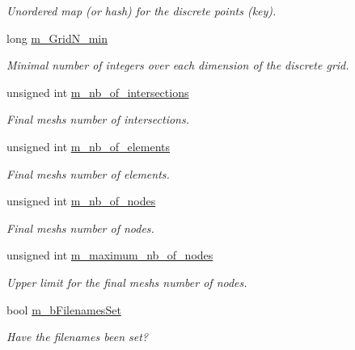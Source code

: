 \begin{DoxyCompactItemize}
\begin{DoxyCompactList}\small\item\em Unordered map (or hash) for the discrete points (key). \end{DoxyCompactList}\item 
long \hyperlink{classcarl_1_1_stitch___meshes_a573f149c7418656a45be9613d3183b5e}{m\+\_\+\+Grid\+N\+\_\+min}
\begin{DoxyCompactList}\small\item\em Minimal number of integers over each dimension of the discrete grid. \end{DoxyCompactList}\item 
unsigned int \hyperlink{classcarl_1_1_stitch___meshes_a764e63989a934f87105b5f978ec999f1}{m\+\_\+nb\+\_\+of\+\_\+intersections}
\begin{DoxyCompactList}\small\item\em Final mesh\textquotesingle{}s number of intersections. \end{DoxyCompactList}\item 
unsigned int \hyperlink{classcarl_1_1_stitch___meshes_a4ed4ce7e9a185c3fd2bd92755888a37e}{m\+\_\+nb\+\_\+of\+\_\+elements}
\begin{DoxyCompactList}\small\item\em Final mesh\textquotesingle{}s number of elements. \end{DoxyCompactList}\item 
unsigned int \hyperlink{classcarl_1_1_stitch___meshes_adfdcce2888197b90c9e56449d1a75b6b}{m\+\_\+nb\+\_\+of\+\_\+nodes}
\begin{DoxyCompactList}\small\item\em Final mesh\textquotesingle{}s number of nodes. \end{DoxyCompactList}\item 
unsigned int \hyperlink{classcarl_1_1_stitch___meshes_a5583a82a08d9560d4b7bf2c1c3c9b815}{m\+\_\+maximum\+\_\+nb\+\_\+of\+\_\+nodes}
\begin{DoxyCompactList}\small\item\em Upper limit for the final mesh\textquotesingle{}s number of nodes. \end{DoxyCompactList}\item 
bool \hyperlink{classcarl_1_1_stitch___meshes_a3f8957cc3d3184c5e3e4ba6d71c18d8f}{m\+\_\+b\+Filenames\+Set}
\begin{DoxyCompactList}\small\item\em Have the filenames been set? \end{DoxyCompactList}\item 

\end{DoxyCompactItemize}
